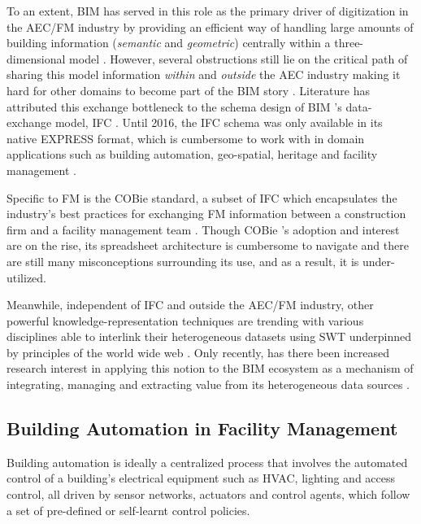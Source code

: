 To an extent, \ac{BIM} has served in this role as the primary driver of digitization in the \ac{AEC/FM} industry by providing an efficient way of handling large amounts of building information (\textit{semantic} and \textit{geometric}) centrally within a three-dimensional model \citep{Borrmann2010}. However, several obstructions still lie on the critical path of sharing this model information \textit{within} and \textit{outside} the AEC industry making it hard for other domains to become part of the BIM story \citep{Pauwels2017a, Pauwels2017SemanticOverview, Jeroen2018}. Literature has attributed this exchange bottleneck to the schema design of \ac{BIM} ’s data-exchange model, \ac{IFC} \citep{Barbau2012, Beetz2009, El-Mekawy2010, Gomez-Romero2015, Msc2016}. Until 2016, the \ac{IFC} schema was only available in its native EXPRESS format, which is cumbersome to work with in domain applications such as building automation, geo-spatial, heritage and facility management \citep{Pauwels2016, Pauwels2016a}. 

Specific to \ac{FM} is the \ac{COBie} standard, a subset of \ac{IFC} which encapsulates the industry’s best practices for exchanging \ac{FM} information between a construction firm and a facility management team \citep{WilliamEast2013FacilityView, Teicholz2018BIMManagers}.  Though \ac{COBie} ’s adoption and interest are on the rise, its spreadsheet architecture is cumbersome to navigate \citep{Anderson2012ConstructionOrganization, Kumar2021DevelopmentDatasheets, Kumar2021ExploringData} and there are still many misconceptions surrounding its use, and as a result, it is under-utilized.

Meanwhile, independent of \ac{IFC} and outside the \ac{AEC/FM} industry, other powerful knowledge-representation techniques are trending with various disciplines able to interlink their heterogeneous datasets using \ac{SWT} underpinned by principles of the world wide web \citep{Berners-Lee2001,Berners-Lee2003, Berners-Lee2006}. Only recently, has there been increased research interest in applying this notion to the \ac{BIM} ecosystem as a mechanism of integrating, managing and extracting value from its heterogeneous data sources \citep{Barbau2012,Beetz2009,Pauwels2016a,Pauwels2016}.

\subsection{Building Automation in Facility Management}

Building automation is ideally a centralized process that involves the automated control of a building's electrical equipment such as \ac{HVAC}, lighting and access control, all driven by sensor networks, actuators and control agents, which follow a set of pre-defined or self-learnt control policies.  

